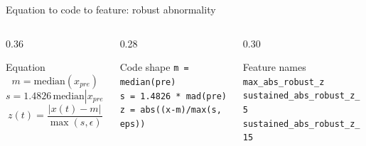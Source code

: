 \documentclass[10pt,aspectratio=169]{beamer}
\newcommand{\code}[1]{\texttt{\footnotesize #1}}
\begin{document}
\begin{frame}{Equation to code to feature: robust abnormality}
\small
\begin{columns}[T,totalwidth=\textwidth]
\begin{column}{0.36\textwidth}
\begin{block}{Equation}
\[
m=\mathrm{median}(x_{pre})
\]
\[
s=1.4826\,\mathrm{median}|x_{pre}-m|
\]
\[
z(t)=\frac{|x(t)-m|}{\max(s,\epsilon)}
\]
\end{block}
\end{column}
\begin{column}{0.28\textwidth}
\begin{exampleblock}{Code shape}
\code{m = median(pre)}\\
\code{s = 1.4826 * mad(pre)}\\
\code{z = abs((x-m)/max(s, eps))}
\end{exampleblock}
\end{column}
\begin{column}{0.30\textwidth}
\begin{alertblock}{Feature names}
\code{max\_abs\_robust\_z}\\
\code{sustained\_abs\_robust\_z\_5}\\
\code{sustained\_abs\_robust\_z\_15}
\end{alertblock}
\end{column}
\end{columns}
\vspace{2mm}
\centering
{}
\end{frame}
\end{document}
